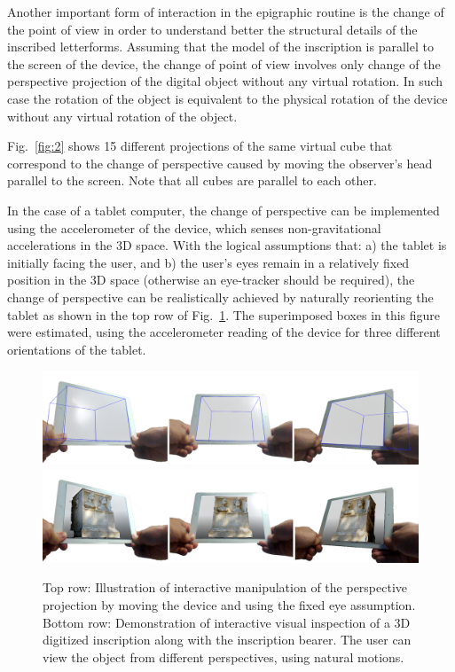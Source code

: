 \documentclass[amsthm,ebook]{saparticle}
\begin{document}
\noindent Another important form of interaction in the epigraphic routine is the change of the point of view in order to
understand better the structural details of the inscribed letterforms. Assuming that the model of the inscription is
parallel to the screen of the device, the change of point of view involves only change of the perspective projection of
the digital object without any virtual rotation. In such case the rotation of the object is equivalent to the physical
rotation of the device without any virtual rotation of the object.

Fig.~\ref{fig:2} shows 15 different projections of the same virtual cube that correspond to the change of perspective caused
by moving the observer's head parallel to the screen. Note that all cubes are parallel to each other.

In the case of a tablet computer, the change of perspective can be implemented using the accelerometer of the device,
which senses non-gravitational accelerations in the 3D space. With the logical assumptions that: a) the tablet is
initially facing the user, and b) the user's eyes remain in a relatively fixed position in the 3D space (otherwise an
eye-tracker should be required), the change of perspective can be realistically achieved by naturally reorienting the
tablet as shown in the top row of Fig.~\ref{fig:3}. The superimposed boxes in this figure were estimated, using the
accelerometer reading of the device for three different orientations of the tablet. 


\begin{figure}[!hbp]
\centering
 \includegraphics[width=\columnwidth]{EAGLE2016cameraready-img004.png}
 \includegraphics[width=\columnwidth]{EAGLE2016cameraready-img005.png}
\caption{Top row: Illustration of interactive manipulation of the perspective projection by moving the device and using
the {\textquotedbl}fixed eye{\textquotedbl} assumption. Bottom row: Demonstration of interactive visual inspection of a
3D digitized inscription along with the inscription bearer. The user can view the object from different perspectives,
using natural motions.}
\label{fig:3}
\end{figure}
\end{document}
